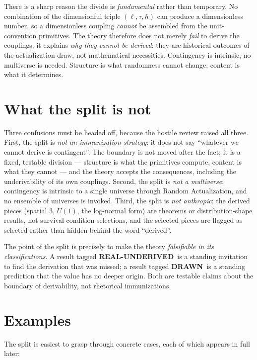 \documentclass[10pt,twoside,openany]{book}
\newcommand{\realunder}{\textbf{REAL-UNDERIVED}}
\newcommand{\drawn}{\textbf{DRAWN}}
\begin{document}
There is a sharp reason the divide is \emph{fundamental} rather than temporary. No
combination of the dimensionful triple $(\ell,\tau,\hbar)$ can produce a dimensionless
number, so a dimensionless coupling \emph{cannot} be assembled from the unit-convention
primitives. The theory therefore does not merely \emph{fail} to derive the couplings; it
explains \emph{why they cannot be derived}: they are historical outcomes of the
actualization draw, not mathematical necessities. Contingency is intrinsic; no multiverse
is needed. Structure is what randomness cannot change; content is what it determines.

\section{What the split is not}

Three confusions must be headed off, because the hostile review raised all three. First,
the split is \emph{not an immunization strategy}: it does not say ``whatever we cannot
derive is contingent''. The boundary is not moved after the fact; it is a fixed, testable
division --- structure is what the primitives compute, content is what they cannot --- and
the theory accepts the consequences, including the underivability of its own couplings.
Second, the split is \emph{not a multiverse}: contingency is intrinsic to a single
universe through Random Actualization, and no ensemble of universes is invoked. Third, the
split is \emph{not anthropic}: the derived pieces (spatial $3$, $U(1)$, the log-normal
form) are theorems or distribution-shape results, not survival-condition selections, and
the selected pieces are flagged as selected rather than hidden behind the word
``derived''.

The point of the split is precisely to make the theory \emph{falsifiable in its
classifications}. A result tagged \realunder\ is a standing invitation to find the
derivation that was missed; a result tagged \drawn\ is a standing prediction that the
value has no deeper origin. Both are testable claims about the boundary of derivability,
not rhetorical immunizations.

\section{Examples}

The split is easiest to grasp through concrete cases, each of which appears in full
later:
\end{document}
